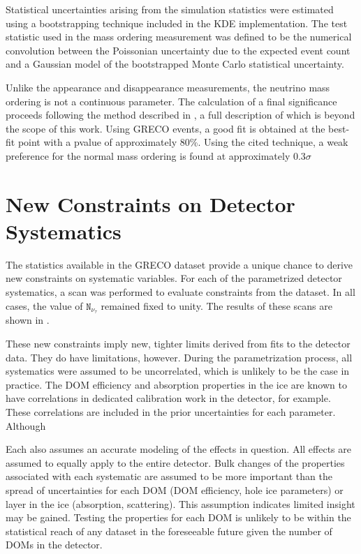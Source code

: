 Statistical uncertainties arising from the simulation statistics were estimated using a bootstrapping technique included in the KDE implementation.
The test statistic used in the mass ordering measurement was defined to be the numerical convolution between the Poissonian uncertainty due to the expected event count and a Gaussian model of the bootstrapped Monte Carlo statistical uncertainty.

Unlike the appearance and disappearance measurements, the neutrino mass ordering is not a continuous parameter. 
The calculation of a final significance proceeds following the method described in , a full description of which is beyond the scope of this work.
Using GRECO events, a good fit is obtained at the best-fit point with a pvalue of approximately 80\%.
Using the cited technique, a weak preference for the normal mass ordering is found at approximately 0.3$\mathtt{\sigma}$ 

\label{subsec:syst_constraints}
\section{New Constraints on Detector Systematics}
The statistics available in the GRECO dataset provide a unique chance to derive new constraints on systematic variables.
For each of the parametrized detector systematics, a scan was performed to evaluate constraints from the dataset.
In all cases, the value of $\mathtt{N_{\nu_\tau}}$ remained fixed to unity.
The results of these scans are shown in .

These new constraints imply new, tighter limits derived from fits to the detector data.
They do have limitations, however.
During the parametrization process, all systematics were assumed to be uncorrelated, which is unlikely to be the case in practice.
The DOM efficiency and absorption properties in the ice are known to have correlations in dedicated calibration work in the detector, for example.
These correlations are included in the prior uncertainties for each parameter.
Although

Each also assumes an accurate modeling of the effects in question.
All effects are assumed to equally apply to the entire detector.
Bulk changes of the properties associated with each systematic are assumed to be more important than the spread of uncertainties for each DOM (DOM efficiency, hole ice parameters) or layer in the ice (absorption, scattering).
This assumption indicates limited insight may be gained.
Testing the properties for each DOM is unlikely to be within the statistical reach of any dataset in the foreseeable future given the number of DOMs in the detector.

